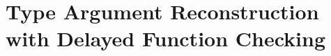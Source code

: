 \chapter{Type Argument Reconstruction with Delayed Function Checking}
\label{chapter:symbolic:directed-lti}

%

%

